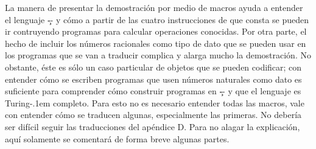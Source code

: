 La manera de presentar la demostración por medio de macros ayuda a entender el lenguaje \c-- y cómo
a partir de las cuatro instrucciones de que consta se pueden ir contruyendo programas para calcular
operaciones conocidas. Por otra parte, el hecho de incluir los números racionales como tipo de dato
que se pueden usar en los programas que se van a traducir complica y alarga mucho la
demostración. No obstante, éste es sólo un caso particular de objetos que se pueden codificar; con
entender cómo se escriben programas que usen números naturales como dato es suficiente para
comprender cómo construir programas en \c-- y que el lenguaje es Turing-\kern.1em completo. Para
esto no es necesario entender todas las macros, vale con entender cómo se traducen algunas,
especialmente las primeras. No debería ser difícil seguir las traducciones del apéndice D. Para no
alagar la explicación, aquí solamente se comentará de forma breve algunas partes.
